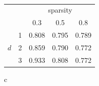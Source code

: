 \documentclass{article}
\begin{document}
\begin{table}[htbp]
 \caption{}
 \begin{center}
  \begin{tabular}{|c|c||c|c|c|}
    \hline
    \multicolumn{2}{|c|}{}  & \multicolumn{3}{|c|}{sparsity} \\
    \cline{3-5}
     \multicolumn{2}{|c|}{}    &  0.3  &  0.5  & 0.8   \\
    \hline
    \hline
       & 1 &  0.808  &  0.795  &  0.789  \\
    \cline{2-5}
     $d$ & 2 &  0.859  &  0.790  & 0.772   \\
    \cline{2-5}
     & 3 &  0.933  &  0.808  &  0.772  \\
    \hline
  \end{tabular}
 \end{center}
\end{table}


\if c\LaTeXe
\quad
\else
\end{document}
